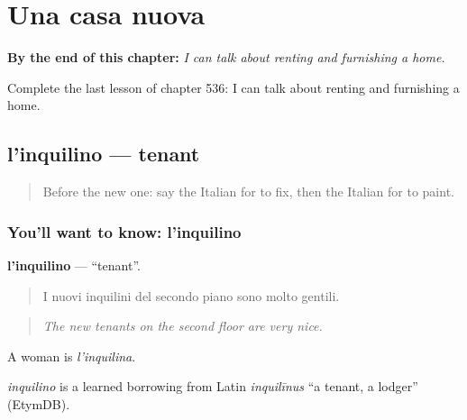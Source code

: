 
\chapter{Una casa nuova}
\label{ch:it-una-casa-nuova}

\begin{chapteropening}
\textbf{By the end of this chapter:} \emph{I can talk about renting and furnishing a home.}

Complete the last lesson of chapter 536: I can talk about renting and furnishing a home.
\end{chapteropening}

\section[l'inquilino]{l'inquilino — tenant}

\label{lesson:IT-C536-inquilino}



\begin{quote}
Before the new one: say the Italian for to fix, then the Italian for to paint.
\end{quote}

\subsection*{You'll want to know: l'inquilino}
\textbf{l'inquilino} — \textquotedblleft{}tenant\textquotedblright{}.

\begin{quote}
I nuovi inquilini del secondo piano sono molto gentili.
\end{quote}

\begin{quote}
\emph{The new tenants on the second floor are very nice.}
\end{quote}

A woman is \emph{l'inquilina}.

\begin{cousinweb}
\emph{inquilino} is a learned borrowing from Latin \emph{inquilīnus} \textquotedblleft{}a tenant, a lodger\textquotedblright{} (EtymDB).
\end{cousinweb}

